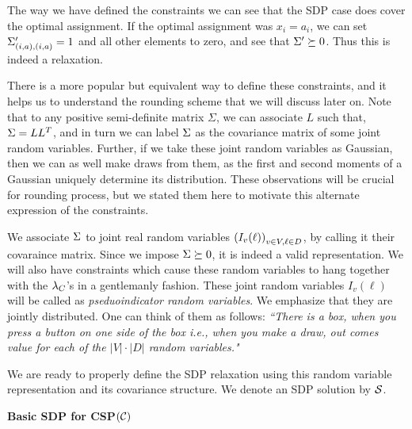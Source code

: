 The way we have defined the constraints we can see that the SDP case does cover the optimal assignment. 
If the optimal assignment was $x_i=a_i$, we can set $ \Sigma'_{\left(i, a\right),\left(i, a\right)} = 1$ and all other elements to zero, and see that $\Sigma' \succeq 0$. 
Thus this is indeed a relaxation.


There is a more popular but equivalent way to define these constraints, and it helps us to understand the rounding scheme that we will discuss later on. 
Note that to any positive semi-definite matrix $\Sigma$, we can associate $L$ such that, $\Sigma = LL^T$, and in turn we can label $\Sigma$ as the covariance matrix of some joint random variables. 
Further, if we take these joint random variables as Gaussian, then we can as well make draws from them, as the first and second moments of a Gaussian  uniquely determine its distribution. 
These observations will be crucial for rounding process, but we stated them here to motivate this alternate expression of the constraints. 

We associate $\Sigma$ to joint real random variables $\left(I_v(\ell)\right)_{v\in V, \ell \in D}$, by calling it their covaraince matrix. Since we impose $\Sigma \succeq 0$, it is indeed a valid representation. 
We will also have constraints which cause these random variables to hang together with the $\lambda_C$'s in a gentlemanly fashion. 
These joint random variables $I_v(\ell)$ will be called as \textit{pseduoindicator random variables}. 
We emphasize that they are jointly distributed. 
One can think of them as follows: 
\textit{``There is a box, when you press a button on one side of the box i.e., when you make a draw, out comes value for each of the $|V| \cdot |D|$ random variables."}

We are ready to properly define the SDP relaxation using this random variable representation and its covariance structure.  
We denote an SDP solution by $\mathcal{S}$. 

{\bf Basic SDP for CSP$(\mathcal{C})$}  

